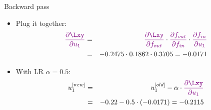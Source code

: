 \begin{vbframe}{Backward pass}
  \begin{itemize}
    \item Plug it together:
  \begin{eqnarray*}
    \textcolor{violet}{\frac{\partial \Lxy}{\partial u_1}} &=& \textcolor{violet}{\frac{\partial \Lxy}{\partial f_{out}}} \cdot \textcolor{violet}{\frac{\partial f_{out}}{\partial f_{in}}} \cdot \textcolor{violet}{\frac{\partial f_{in}}{\partial u_1}} \\
                                        &=& \num[round-mode=places,round-precision=4]{-0.2474531} \cdot \num[round-mode=places,round-precision=4]{0.1862201} \cdot \num[round-mode=places,round-precision=4]{0.3705169} = \num[round-mode=places,round-precision=4]{-0.01707369}
  \end{eqnarray*}
    \begin{figure}
      \centering
    \end{figure}

\item  With LR $\alpha = 0.5$:
    \begin{eqnarray*}
      u_1^{[new]} &=& u_1^{[old]} - \alpha \cdot \textcolor{violet}{\frac{\partial \Lxy}{\partial u_1}} \\
                &=& -0.22 - 0.5 \cdot (\num[round-mode=places,round-precision=4]{-0.01707369}) = \num[round-mode=places,round-precision=4]{-0.2114632}
    \end{eqnarray*}
  \end{itemize}
\framebreak


\end{vbframe}
